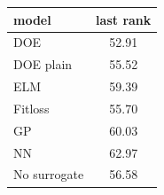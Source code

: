 \begin{tabular}{|lc|}
\hline
model & last rank\\
\hline
DOE & 52.91 \\
DOE plain & 55.52 \\
ELM & 59.39 \\
Fitloss & 55.70 \\
GP & 60.03 \\
NN & 62.97 \\
No surrogate & 56.58 \\
\hline
\end{tabular}
